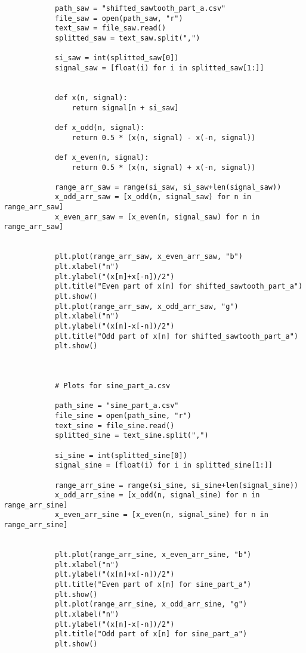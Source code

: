 \documentclass[10pt,a4paper, margin=1in]{article}
\begin{document}
\begin{enumerate}
\begin{enumerate}
\begin{verbatim}
            path_saw = "shifted_sawtooth_part_a.csv" 
            file_saw = open(path_saw, "r")
            text_saw = file_saw.read()
            splitted_saw = text_saw.split(",")
            
            si_saw = int(splitted_saw[0])
            signal_saw = [float(i) for i in splitted_saw[1:]]
            
            
            def x(n, signal):
                return signal[n + si_saw]
            
            def x_odd(n, signal):
                return 0.5 * (x(n, signal) - x(-n, signal))   
            
            def x_even(n, signal):
                return 0.5 * (x(n, signal) + x(-n, signal))
            
            range_arr_saw = range(si_saw, si_saw+len(signal_saw))
            x_odd_arr_saw = [x_odd(n, signal_saw) for n in range_arr_saw]
            x_even_arr_saw = [x_even(n, signal_saw) for n in range_arr_saw]
            
            
            plt.plot(range_arr_saw, x_even_arr_saw, "b")
            plt.xlabel("n")
            plt.ylabel("(x[n]+x[-n])/2")
            plt.title("Even part of x[n] for shifted_sawtooth_part_a")
            plt.show()
            plt.plot(range_arr_saw, x_odd_arr_saw, "g")
            plt.xlabel("n")
            plt.ylabel("(x[n]-x[-n])/2")
            plt.title("Odd part of x[n] for shifted_sawtooth_part_a")
            plt.show()
            
            
            
            # Plots for sine_part_a.csv
            
            path_sine = "sine_part_a.csv"
            file_sine = open(path_sine, "r")
            text_sine = file_sine.read()
            splitted_sine = text_sine.split(",")
            
            si_sine = int(splitted_sine[0])
            signal_sine = [float(i) for i in splitted_sine[1:]]
            
            range_arr_sine = range(si_sine, si_sine+len(signal_sine))
            x_odd_arr_sine = [x_odd(n, signal_sine) for n in range_arr_sine]
            x_even_arr_sine = [x_even(n, signal_sine) for n in range_arr_sine]
            
            
            plt.plot(range_arr_sine, x_even_arr_sine, "b")
            plt.xlabel("n")
            plt.ylabel("(x[n]+x[-n])/2")
            plt.title("Even part of x[n] for sine_part_a")
            plt.show()
            plt.plot(range_arr_sine, x_odd_arr_sine, "g")
            plt.xlabel("n")
            plt.ylabel("(x[n]-x[-n])/2")
            plt.title("Odd part of x[n] for sine_part_a")
            plt.show()
            

\end{verbatim}
\end{enumerate}
\end{enumerate}
\end{document}

